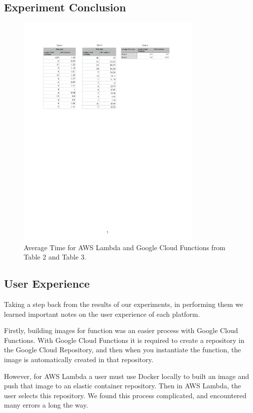 \documentclass[10pt, conference]{IEEEtran}
\begin{document}
\subsection{Experiment Conclusion}

\begin{figure}[htbp]
\centerline{\includegraphics[width=9cm]{table4.PDF}}
\caption{Average Time for AWS Lambda and Google Cloud Functions from Table 2 and Table 3.}
\label{fig:table4}
\end{figure}


\subsection{User Experience}

Taking a step back from the results of our experiments, in performing them we learned important notes on the user experience of each platform. 

Firstly, building images for function was an easier process with Google Cloud Functions. With Google Cloud Functions it is required to create a repository in the Google Cloud Repository, and then when you instantiate the function, the image is automatically created in that repository. 

However, for AWS Lambda a user must use Docker locally to built an image and push that image to an elastic container repository. Then in AWS Lambda, the user selects this repository. We found this process complicated, and encountered many errors a long the way. 
\end{document}
